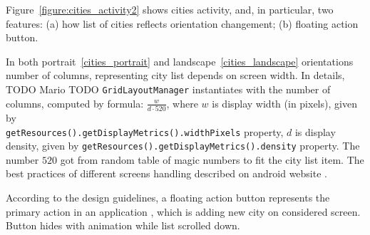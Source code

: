 \documentclass[runningheads,a4paper]{llncs}
\begin{document}
%

Figure~\ref{figure:cities_activity2} shows cities activity, and, in particular,
two features: (a) how list of cities reflects orientation changement; (b) floating
action button.

In both portrait~\ref{cities_portrait} and landscape~\ref{cities_landscape}
orientations number of columns, representing city list depends on screen width.
In details, TODO Mario TODO \texttt{GridLayoutManager} 
instantiates with the number of columns, computed by formula:
$\frac{w}{d \cdot 520}$, where $w$ is display width (in pixels), given by \\
\texttt{getResources().getDisplayMetrics().widthPixels} property, $d$ is
display density, given by \texttt{getResources().getDisplayMetrics().density}
property. The number $520$ got from random table of magic numbers to fit the city list item.
The best practices of different screens handling described on android website
\cite{android_screens}.


According to the design guidelines, a floating action button represents the primary
action in an application \cite{material_fab}, which is adding new city on 
considered screen. Button hides with animation while list scrolled down.
\end{document}
